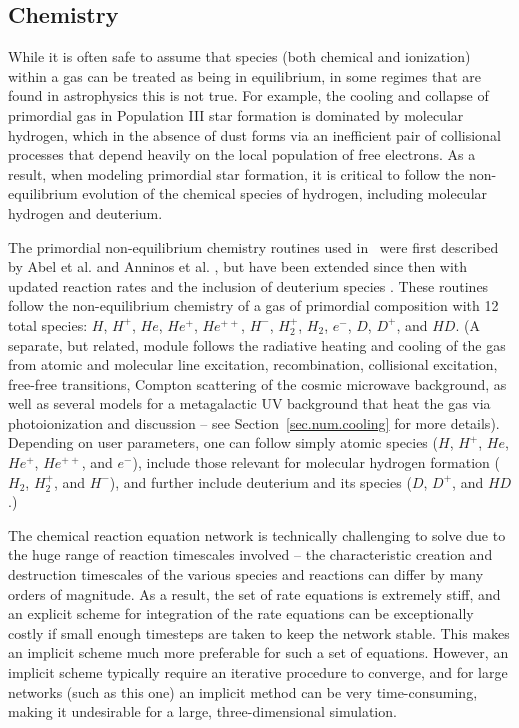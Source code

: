 \subsection{Chemistry}
\label{sec.num.chemistry}

While it is often safe to assume that species (both chemical and
ionization) within a gas can be treated as being in equilibrium, in
some regimes that are found in astrophysics this is not true.  For
example, the cooling and collapse of primordial gas in Population III
star formation is dominated by molecular hydrogen, which in the
absence of dust forms via an inefficient pair of collisional processes
that depend heavily on the local population of free electrons.  As a
result, when modeling primordial star formation, it is critical to
follow the non-equilibrium evolution of the chemical species of
hydrogen, including molecular hydrogen and deuterium.

The primordial non-equilibrium chemistry routines used in \enzo\ were
first described by Abel et al. and Anninos et
al. \citep{abel97,anninos97}, but have been extended since then with
updated reaction rates and the inclusion of deuterium species
\citep{2009PhDT.........5T}.  These routines follow the
non-equilibrium chemistry of a gas of primordial composition with 12
total species: $H$, $H^+$, $He$, $He^+$, $He^{++}$, $H^-$, $H_2^+$,
$H_2$, $e^-$, $D$, $D^+$, and $HD$.  (A separate, but related, module
follows the radiative heating and cooling of the gas from atomic and
molecular line excitation, recombination, collisional excitation,
free-free transitions, Compton scattering of the cosmic microwave
background, as well as several models for a metagalactic UV background
that heat the gas via photoionization and discussion -- see
Section~\ref{sec.num.cooling} for more details).  Depending on user
parameters, one can follow simply atomic species ($H$, $H^+$, $He$,
$He^+$, $He^{++}$, and $e^-$), include those relevant for molecular
hydrogen formation ($H_2$, $H_2^+$, and $H^-$), and further include
deuterium and its species ($D$, $D^+$, and $HD$.)  

The chemical reaction equation network is technically challenging to
solve due to the huge range of reaction timescales involved -- the
characteristic creation and destruction timescales of the various
species and reactions can differ by many orders of magnitude.  As a
result, the set of rate equations is extremely stiff, and an explicit
scheme for integration of the rate equations can be exceptionally
costly if small enough timesteps are taken to keep the network stable.
This makes an implicit scheme much more preferable for such a set of
equations.  However, an implicit scheme typically require an iterative
procedure to converge, and for large networks (such as this one) an
implicit method can be very time-consuming, making it undesirable for
a large, three-dimensional simulation.

